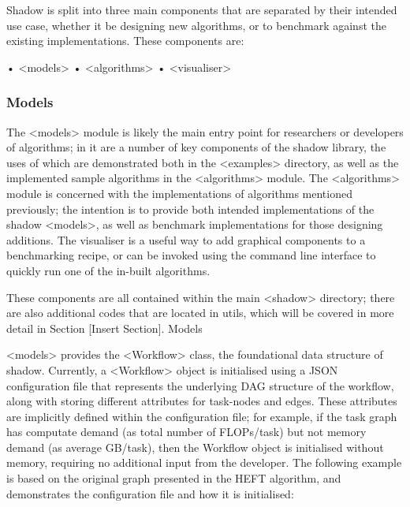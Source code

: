 \documentclass{article}
\begin{document}
\begin{multicols}{2}
Shadow is split into three main components that are separated by their intended use case, whether it be designing new algorithms, or to benchmark against the existing implementations. These components are:

	•	<models>
	•	<algorithms>
	•	<visualiser>

\subsubsection*{Models}
The <models> module is likely the main entry point for researchers or developers of algorithms; in it are a number of key components of the shadow library, the uses of which are demonstrated both in the <examples> directory, as well as the implemented sample algorithms in the <algorithms> module. The <algorithms> module is concerned with the implementations of algorithms mentioned previously; the intention is to provide both intended implementations of the shadow <models>, as well as benchmark implementations for those designing additions. The visualiser is a useful way to add graphical components to a benchmarking recipe, or can be invoked using the command line interface to quickly run one of the in-built algorithms. 

These components are all contained within the main <shadow> directory; there are also additional codes that are located in utils, which will be covered in more detail in Section [Insert Section].
Models

<models> provides the <Workflow> class, the foundational data structure of shadow. Currently, a <Workflow> object is initialised using a JSON configuration file that represents the underlying DAG  structure of the workflow, along with storing different attributes for task-nodes and edges. These attributes are implicitly defined within the configuration file; for example, if the task graph has computate demand (as total number of FLOPs/task) but not memory demand (as average GB/task), then the Workflow object is initialised without memory, requiring no additional input from the developer. The following example is based on the original graph presented in the HEFT algorithm, and demonstrates the configuration file and how it is initialised: 


\end{multicols}
\end{document}
